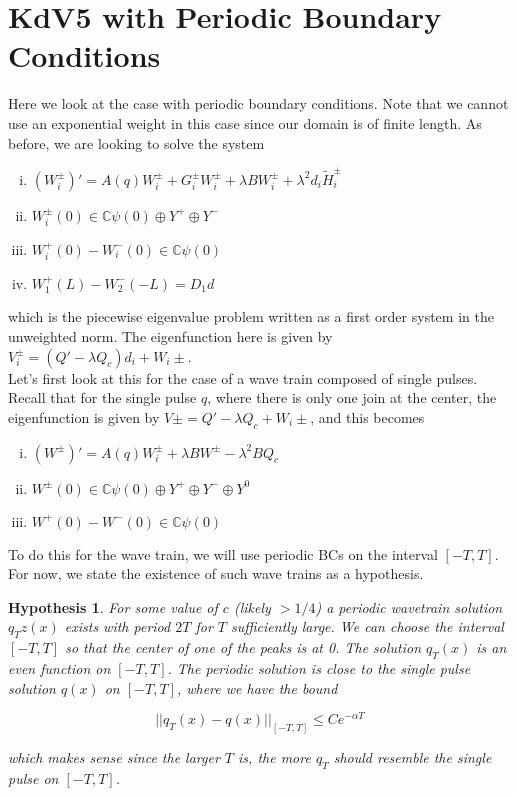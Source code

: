\documentclass[12pt]{article}
\def\C{{\mathbb C}}
\newtheorem{hypothesis}{Hypothesis}
\begin{document}
\section*{KdV5 with Periodic Boundary Conditions}

Here we look at the case with periodic boundary conditions. Note that we cannot use an exponential weight in this case since our domain is of finite length. As before, we are looking to solve the system

\begin{enumerate}[(i)]
\item $(W_i^\pm)' = A(q) W_i^\pm + G_i^\pm W_i^\pm + \lambda B W_i^\pm + \lambda^2 d_i \tilde{H}_i^\pm$
\item $W_i^\pm(0) \in \C \psi(0) \oplus Y^+ \oplus Y^-$
\item $W_i^+(0) - W_i^-(0) \in \C \psi(0) $
\item $W_1^+(L) - W_2^-(-L) = D_1 d $
\end{enumerate}

which is the piecewise eigenvalue problem written as a first order system in the unweighted norm. The eigenfunction here is given by $V_i^\pm = (Q' - \lambda Q_c)d_i + W_i\pm$.\\

Let's first look at this for the case of a wave train composed of single pulses. Recall that for the single pulse $q$, where there is only one join at the center, the eigenfunction is given by $V\pm = Q' - \lambda Q_c + W_i\pm$, and this becomes

\begin{enumerate}[(i)]
\item $(W^\pm)' = A(q) W_i^\pm + \lambda B W^\pm - \lambda^2 B Q_c$
\item $W^\pm(0) \in \C \psi(0) \oplus Y^+ \oplus Y^- \oplus Y^0$
\item $W^+(0) - W^-(0) \in \C \psi(0) $
\end{enumerate}

To do this for the wave train, we will use periodic BCs on the interval $[-T, T]$. For now, we state the existence of such wave trains as a hypothesis.

\begin{hypothesis}\label{qpexists}
For some value of $c$ (likely $> 1/4$) a periodic wavetrain solution $q_Tz(x)$ exists with period $2T$ for $T$ sufficiently large. We can choose the interval $[-T,T]$ so that the center of one of the peaks is at 0. The solution $q_T(x)$ is an even function on $[-T, T]$. The periodic solution is close to the single pulse solution $q(x)$ on $[-T, T]$, where we have the bound 

\[
||q_T(x) - q(x)||_{[-T, T]} \leq C e^{-\alpha T}
\]

which makes sense since the larger $T$ is, the more $q_T$ should resemble the single pulse on $[-T, T]$.
\end{hypothesis}
\end{document}
